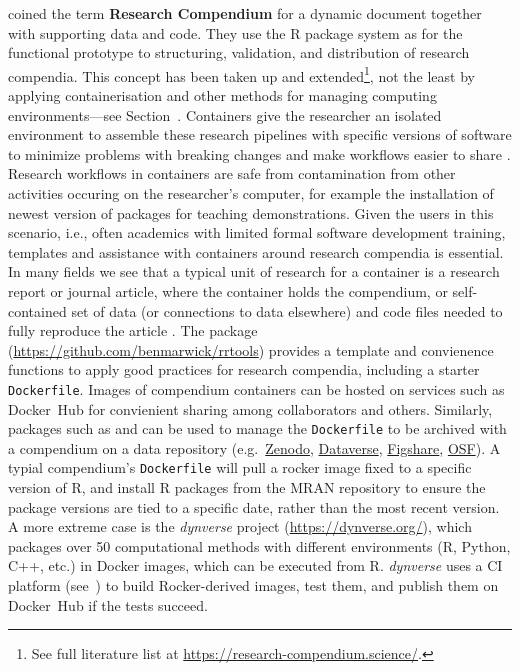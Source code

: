 \citet{gentleman_statistical_2007} coined the term \textbf{Research
Compendium} for a dynamic document together with supporting data and
code. They use the R package system \cite{core_writing_1999} as for the
functional prototype to structuring, validation, and distribution of
research compendia. This concept has been taken up and
extended\footnote{See full literature list at \href{https://research-compendium.science/}{https://research-compendium.science/}.},
not the least by applying containerisation and other methods for
managing computing environments---see Section~. Containers
give the researcher an isolated environment to assemble these research
pipelines with specific versions of software to minimize problems with
breaking changes and make workflows easier to share
\citep[cf.][]{boettiger_introduction_2015,marwick_packaging_2018}.
Research workflows in containers are safe from contamination from other
activities occuring on the researcher's computer, for example the
installation of newest version of packages for teaching demonstrations.
Given the users in this scenario, i.e., often academics with limited
formal software development training, templates and assistance with
containers around research compendia is essential. In many fields we see
that a typical unit of research for a container is a research report or
journal article, where the container holds the compendium, or
self-contained set of data (or connections to data elsewhere) and code
files needed to fully reproduce the article
\citep{marwick_packaging_2018}. The package 
(\url{https://github.com/benmarwick/rrtools}) provides a template and
convienence functions to apply good practices for research compendia,
including a starter \texttt{Dockerfile}. Images of compendium containers
can be hosted on services such as Docker~Hub for convienient sharing
among collaborators and others. Similarly, packages such as
 and  can be used to manage the
\texttt{Dockerfile} to be archived with a compendium on a data
repository (e.g.~\href{https://zenodo.org/}{Zenodo},
\href{https://dataverse.org/}{Dataverse},
\href{https://figshare.com/}{Figshare}, \href{https://osf.io/}{OSF}). A
typial compendium's \texttt{Dockerfile} will pull a rocker image fixed
to a specific version of R, and install R packages from the MRAN
repository to ensure the package versions are tied to a specific date,
rather than the most recent version. A more extreme case is the
\emph{dynverse} project (\url{https://dynverse.org/}), which packages
over 50 computational methods with different environments (R, Python,
C++, etc.) in Docker images, which can be executed from R.
\emph{dynverse} uses a CI platform (see~) to build
Rocker-derived images, test them, and publish them on Docker~Hub if the
tests succeed.

